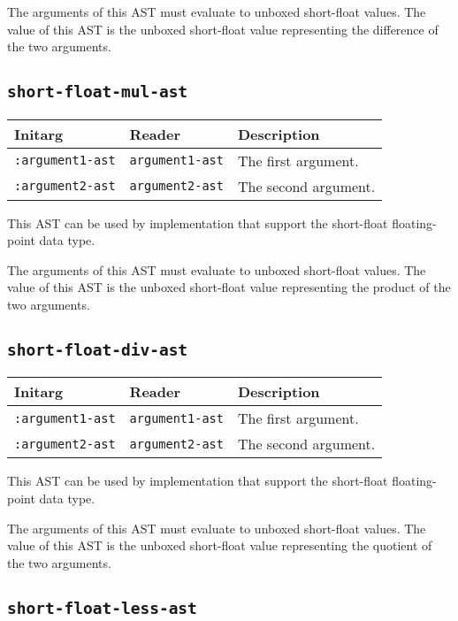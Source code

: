 The arguments of this AST must evaluate to unboxed short-float
values.  The value of this AST is the unboxed short-float value
representing the difference of the two arguments.

\subsection{\texttt{short-float-mul-ast}}
\label{sec-ast-short-float-mul}

\begin{tabular}{|l|l|l|}
\hline
Initarg & Reader & Description\\
\hline\hline
\texttt{:argument1-ast} & \texttt{argument1-ast} & The first argument.\\
\hline
\texttt{:argument2-ast} & \texttt{argument2-ast} & The second argument.\\
\hline
\end{tabular}

This AST can be used by implementation that support the short-float
floating-point data type.  

The arguments of this AST must evaluate to unboxed short-float
values.  The value of this AST is the unboxed short-float value
representing the product of the two arguments.

\subsection{\texttt{short-float-div-ast}}
\label{sec-ast-short-float-div}

\begin{tabular}{|l|l|l|}
\hline
Initarg & Reader & Description\\
\hline\hline
\texttt{:argument1-ast} & \texttt{argument1-ast} & The first argument.\\
\hline
\texttt{:argument2-ast} & \texttt{argument2-ast} & The second argument.\\
\hline
\end{tabular}

This AST can be used by implementation that support the short-float
floating-point data type.  

The arguments of this AST must evaluate to unboxed short-float
values.  The value of this AST is the unboxed short-float value
representing the quotient of the two arguments.

\subsection{\texttt{short-float-less-ast}}
\label{sec-ast-short-float-less}

